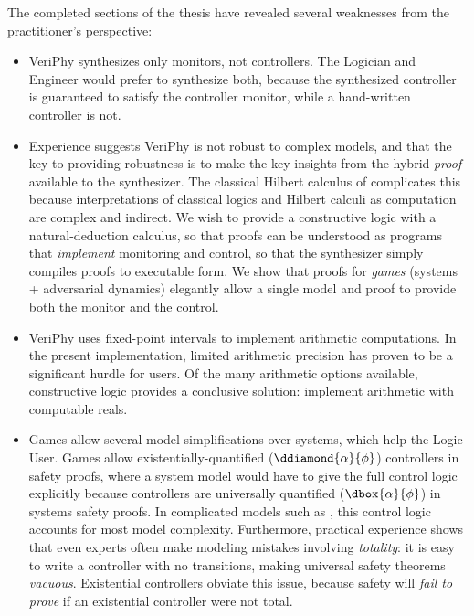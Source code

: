 \documentclass[12pt]{cmuthesis}
\theoremstyle{definition}
\theoremstyle{remark}
\newcommand{\rref}[2][]{\prettyref{#2}}
\newcommand{\VeriPhy}{VeriPhy\xspace}
\begin{document}
The completed sections of the thesis have revealed several weaknesses from the practitioner's perspective:
\begin{itemize}
\item
\VeriPhy synthesizes only monitors, not controllers.
The Logician and Engineer would prefer to synthesize both, because the synthesized controller is guaranteed to satisfy the controller monitor, while a hand-written controller is not.
\item
Experience suggests \VeriPhy is not robust to complex models, and that the key to providing robustness is to make the key insights from the hybrid \emph{proof} available to the synthesizer.
The classical Hilbert calculus of \dL complicates this because interpretations of classical logics and Hilbert calculi as computation are complex and indirect.
We wish to provide a constructive logic with a natural-deduction calculus, so that proofs can be understood as programs that \emph{implement} monitoring and control, so that the synthesizer simply compiles proofs to executable form.
We show that proofs for \emph{games} (systems + adversarial dynamics) elegantly allow a single model and proof to provide both the monitor and the control.
\item
\VeriPhy uses fixed-point intervals to implement arithmetic computations.
In the present implementation, limited arithmetic precision has proven to be a significant hurdle for users.
Of the many arithmetic options available, constructive logic provides a conclusive solution: implement arithmetic with computable reals.
\item
Games allow several model simplifications over systems, which help the Logic-User.
Games allow existentially-quantified ($\ddiamond{\alpha}{\phi}$) controllers in safety proofs, where a system model would have to give the full control logic explicitly because controllers are universally quantified ($\dbox{\alpha}{\phi}$) in systems safety proofs.
In complicated models such as \rref{ch:end-to-end-v}, this control logic accounts for most model complexity.
Furthermore, practical experience shows that even experts often make modeling mistakes involving \emph{totality}: it is easy to write a controller with no transitions, making universal safety theorems \emph{vacuous}.
Existential controllers obviate this issue, because safety will \emph{fail to prove} if an existential controller were not total.
\end{itemize}
\end{document}
